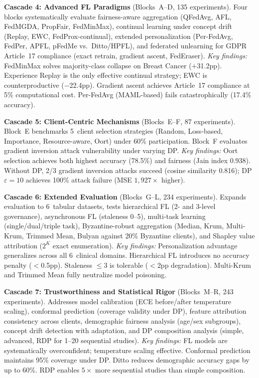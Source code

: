 \documentclass[conference,a4paper]{IEEEtran}
\begin{document}
\smallskip\noindent\textbf{Cascade 4: Advanced FL Paradigms} (Blocks~A--D, 135 experiments). Four blocks systematically evaluate fairness-aware aggregation (QFedAvg, AFL, FedMGDA, PropFair, FedMinMax), continual learning under concept drift (Replay, EWC, FedProx-continual), extended personalization (Per-FedAvg, FedPer, APFL, pFedMe vs.\ Ditto/HPFL), and federated unlearning for GDPR Article~17 compliance (exact retrain, gradient ascent, FedEraser). \textit{Key findings:} FedMinMax solves majority-class collapse on Breast Cancer ($+$31.2pp). Experience Replay is the only effective continual strategy; EWC is counterproductive ($-$22.4pp). Gradient ascent achieves Article~17 compliance at 5\% computational cost. Per-FedAvg (MAML-based) fails catastrophically (17.4\% accuracy).

\smallskip\noindent\textbf{Cascade 5: Client-Centric Mechanisms} (Blocks~E--F, 87 experiments). Block~E benchmarks 5~client selection strategies (Random, Loss-based, Importance, Resource-aware, Oort) under 60\% participation. Block~F evaluates gradient inversion attack vulnerability under varying DP. \textit{Key findings:} Oort selection achieves both highest accuracy (78.5\%) and fairness (Jain index 0.938). Without DP, 2/3 gradient inversion attacks succeed (cosine similarity 0.816); DP $\varepsilon{=}10$ achieves 100\% attack failure (MSE $1{,}927\times$ higher).

\smallskip\noindent\textbf{Cascade 6: Extended Evaluation} (Blocks~G--L, 234 experiments). Expands evaluation to 6~tabular datasets, tests hierarchical FL (2- and 3-level governance), asynchronous FL (staleness 0--5), multi-task learning (single/dual/triple task), Byzantine-robust aggregation (Median, Krum, Multi-Krum, Trimmed Mean, Bulyan against 20\% Byzantine clients), and Shapley value attribution ($2^K$ exact enumeration). \textit{Key findings:} Personalization advantage generalizes across all 6~clinical domains. Hierarchical FL introduces no accuracy penalty ($<$0.5pp). Staleness $\leq$3 is tolerable ($<$2pp degradation). Multi-Krum and Trimmed Mean fully neutralize model poisoning.

\smallskip\noindent\textbf{Cascade 7: Trustworthiness and Statistical Rigor} (Blocks~M--R, 243 experiments). Addresses model calibration (ECE before/after temperature scaling), conformal prediction (coverage validity under DP), feature attribution consistency across clients, demographic fairness analysis (age/sex subgroups), concept drift detection with adaptation, and DP composition analysis (simple, advanced, RDP for 1--20 sequential studies). \textit{Key findings:} FL models are systematically overconfident; temperature scaling effective. Conformal prediction maintains 95\% coverage under DP. Ditto reduces demographic accuracy gaps by up to 60\%. RDP enables $5\times$ more sequential studies than simple composition.
\end{document}
